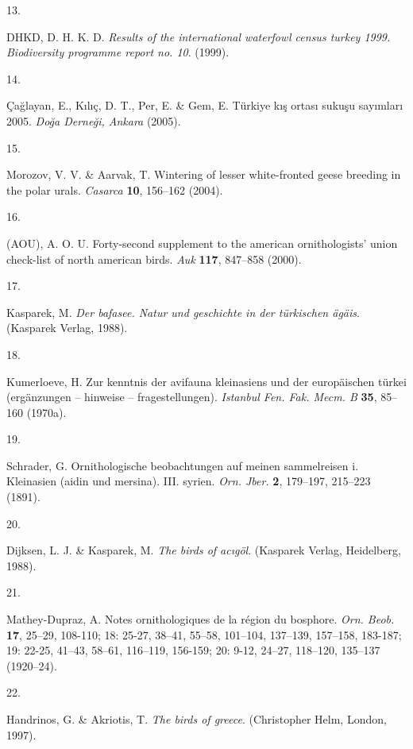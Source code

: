 \documentclass[
  letterpaper,
  DIV=11,
  numbers=noendperiod]{scrreprt}
\newlength{\cslhangindent}
\newlength{\csllabelwidth}
\newenvironment{CSLReferences}[2] %
 {\begin{list}{}{%
  \setlength{\itemindent}{0pt}
  \setlength{\leftmargin}{0pt}
  \setlength{\parsep}{0pt}
  \ifodd #1
   \setlength{\leftmargin}{\cslhangindent}
   \setlength{\itemindent}{-1\cslhangindent}
  \fi
  \setlength{\itemsep}{#2\baselineskip}}}
 {\end{list}}
\newcommand{\CSLLeftMargin}[1]{\parbox[t]{\csllabelwidth}{\strut#1\strut}}
\newcommand{\CSLRightInline}[1]{\parbox[t]{\linewidth - \csllabelwidth}{\strut#1\strut}}
\begin{document}
\begin{CSLReferences}{0}{0}
\CSLLeftMargin{13. }%
\CSLRightInline{DHKD, D. H. K. D. \emph{Results of the international
waterfowl census turkey 1999. Biodiversity programme report no. 10}.
(1999).}

\CSLLeftMargin{14. }%
\CSLRightInline{Çağlayan, E., Kılıç, D. T., Per, E. \& Gem, E. Türkiye
kış ortası sukuşu sayımları 2005. \emph{Doğa Derneği, Ankara} (2005).}

\CSLLeftMargin{15. }%
\CSLRightInline{Morozov, V. V. \& Aarvak, T. Wintering of lesser
white-fronted geese breeding in the polar urals. \emph{Casarca}
\textbf{10}, 156--162 (2004).}

\CSLLeftMargin{16. }%
\CSLRightInline{(AOU), A. O. U. Forty-second supplement to the american
ornithologists' union check-list of north american birds. \emph{Auk}
\textbf{117}, 847--858 (2000).}

\CSLLeftMargin{17. }%
\CSLRightInline{Kasparek, M. \emph{Der bafasee. Natur und geschichte in
der türkischen ägäis}. (Kasparek Verlag, 1988).}

\CSLLeftMargin{18. }%
\CSLRightInline{Kumerloeve, H. Zur kenntnis der avifauna kleinasiens und
der europäischen türkei (ergänzungen -- hinweise -- fragestellungen).
\emph{Istanbul Fen. Fak. Mecm. B} \textbf{35}, 85--160 (1970a).}

\CSLLeftMargin{19. }%
\CSLRightInline{Schrader, G. Ornithologische beobachtungen auf meinen
sammelreisen i. Kleinasien (aidin und mersina). III. syrien. \emph{Orn.
Jber.} \textbf{2}, 179--197, 215--223 (1891).}

\CSLLeftMargin{20. }%
\CSLRightInline{Dijksen, L. J. \& Kasparek, M. \emph{The birds of
acıgöl}. (Kasparek Verlag, Heidelberg, 1988).}

\CSLLeftMargin{21. }%
\CSLRightInline{Mathey-Dupraz, A. Notes ornithologiques de la région du
bosphore. \emph{Orn. Beob.} \textbf{17}, 25--29, 108-110; 18: 25-27,
38--41, 55--58, 101--104, 137--139, 157--158, 183-187; 19: 22-25,
41--43, 58--61, 116--119, 156-159; 20: 9-12, 24--27, 118--120, 135--137
(1920--24).}

\CSLLeftMargin{22. }%
\CSLRightInline{Handrinos, G. \& Akriotis, T. \emph{The birds of
greece}. (Christopher Helm, London, 1997).}


\end{CSLReferences}
\end{document}
